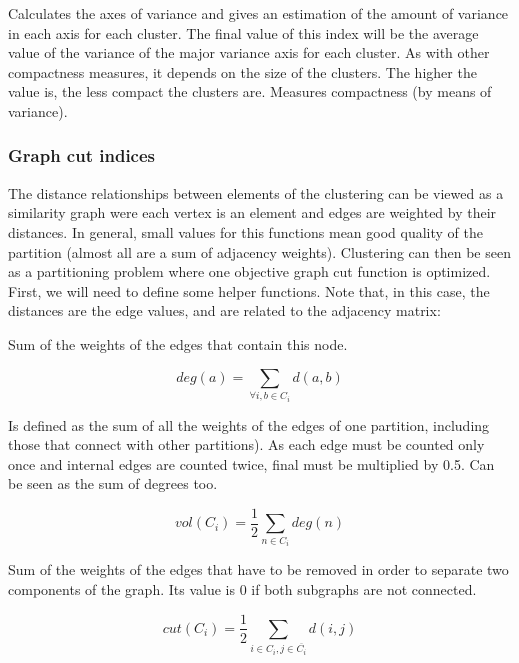 
Calculates the axes of variance and gives an estimation of the amount
of variance in each axis for each cluster. The final value of this
index will be the average value of the variance of the major variance
axis for each cluster. As with other compactness measures, it depends
on the size of the clusters. The higher the value is, the less compact
the clusters are. Measures compactness (by means of variance).


\subsubsection{Graph cut indices}

The distance relationships between elements of the clustering can
be viewed as a similarity graph were each vertex is an element and
edges are weighted by their distances. In general, small values for
this functions mean good quality of the partition (almost all are
a sum of adjacency weights). Clustering can then be seen as a
partitioning problem where one objective graph cut function is optimized.
First, we will need to define some helper functions. Note that,
in this case, the distances are the edge values, and are related to the 
adjacency matrix:

Sum of the weights of the edges that contain this node.

\begin{equation}
deg(a)=\sum_{\forall i, b \in C_{i}} d(a,b)
\end{equation}

Is defined as the sum of all the weights of the edges of one partition, including those that connect with other partitions). As each edge must be counted only once and internal edges are counted twice, final  must be multiplied by 0.5. Can be seen as the sum of degrees too.

\begin{equation}
vol(C_{i})= \frac{1}{2} \sum_{n\in C_{i}} deg(n)
\end{equation}

Sum of the weights of the edges that have to be removed in order to separate two 
components of the graph. Its value is 0 if both subgraphs are not connected.

\begin{equation} 
cut(C_{i})=\frac{1}{2}\sum_{i \in C_{i} , j \in \overline{C_{i}}} d(i,j) 
\end{equation}


